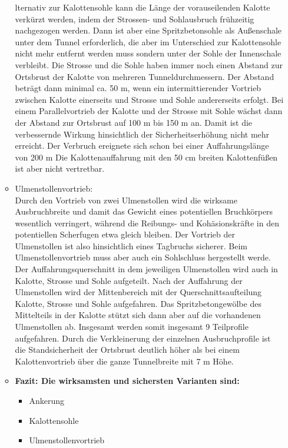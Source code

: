 \documentclass[fleqn,twoside]{article}
\begin{document}
\begin{small}
\begin{itemize}
\begin{itemize}[label={$\blacktriangleright$}]
         lternativ zur Kalottensohle kann die Länge der vorauseilenden Kalotte verkürzt werden, indem der Strossen- und Sohlausbruch frühzeitig nachgezogen werden. Dann ist aber eine Spritzbetonsohle als Außenschale unter dem Tunnel erforderlich, die aber im Unterschied zur Kalottensohle nicht mehr entfernt werden muss sondern unter der Sohle der Innenschale verbleibt. Die Strosse und die Sohle haben immer noch einen Abstand zur Ortsbrust der Kalotte von mehreren Tunneldurchmessern. Der Abstand beträgt dann minimal ca. 50 m, wenn ein intermittierender Vortrieb zwischen Kalotte einerseits und Strosse und Sohle andererseits erfolgt. Bei einem Parallelvortrieb der Kalotte und der Strosse mit Sohle wächst dann der Abstand zur Ortsbrust auf 100 m bis 150 m an. Damit ist die verbessernde Wirkung hinsichtlich der Sicherheitserhöhung nicht mehr erreicht. Der Verbruch ereignete sich schon bei einer Auffahrungslänge von 200 m Die Kalottenauffahrung mit den 50 cm breiten Kalottenfüßen ist aber nicht vertretbar.
         \item Ulmenstollenvortrieb:\\
         Durch den Vortrieb von zwei Ulmenstollen wird die wirksame Ausbruchbreite und damit das Gewicht eines potentiellen Bruchkörpers wesentlich verringert, während die Reibungs- und Kohäsionskräfte in den potentiellen Scherfugen etwa gleich bleiben. Der Vortrieb der Ulmenstollen ist also hinsichtlich eines Tagbruchs sicherer. Beim Ulmenstollenvortrieb muss aber auch ein Sohlschluss hergestellt werde. Der Auffahrungsquerschnitt in dem jeweiligen Ulmenstollen wird auch in Kalotte, Strosse und Sohle aufgeteilt. Nach der Auffahrung der Ulmenstollen wird der Mittenbereich mit der Querschnittsaufteilung Kalotte, Strosse und Sohle aufgefahren. Das Spritzbetongewölbe des Mittelteils in der Kalotte stützt sich dann aber auf die vorhandenen Ulmenstollen ab. Insgesamt werden somit insgesamt 9 Teilprofile aufgefahren. Durch die Verkleinerung der einzelnen Ausbruchprofile ist die Standsicherheit der Ortsbrust deutlich höher als bei einem Kalottenvortrieb über die ganze Tunnelbreite mit 7 m Höhe.
         \item \textbf{Fazit: Die wirksamsten und sichersten Varianten sind:}
         \begin{itemize}
             \item Ankerung
             \item Kalottensohle
             \item Ulmenstollenvortrieb
         \end{itemize}
    \end{itemize}
    

\end{itemize}
\end{small}
\end{document}
